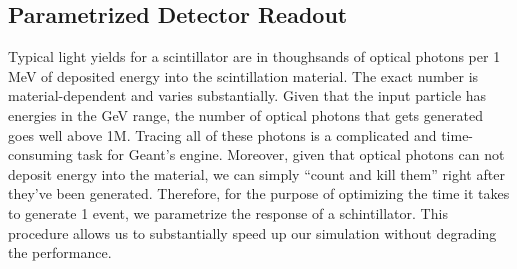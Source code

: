 \subsection{Parametrized Detector Readout}
Typical light yields for a scintillator are in thoughsands of optical photons per 1 MeV of deposited energy into the scintillation material. The exact number is material-dependent and varies substantially. Given that the input particle has energies in the GeV range, the number of optical photons that gets generated goes well above 1M. Tracing all of these photons is a complicated and time-consuming task for Geant's engine. Moreover, given that optical photons can not deposit energy into the material, we can simply ``count and kill them'' right after they've been generated. Therefore, for the purpose of optimizing the time it takes to generate 1 event, we parametrize the response of a schintillator. This procedure allows us to substantially speed up our simulation without degrading the performance.

